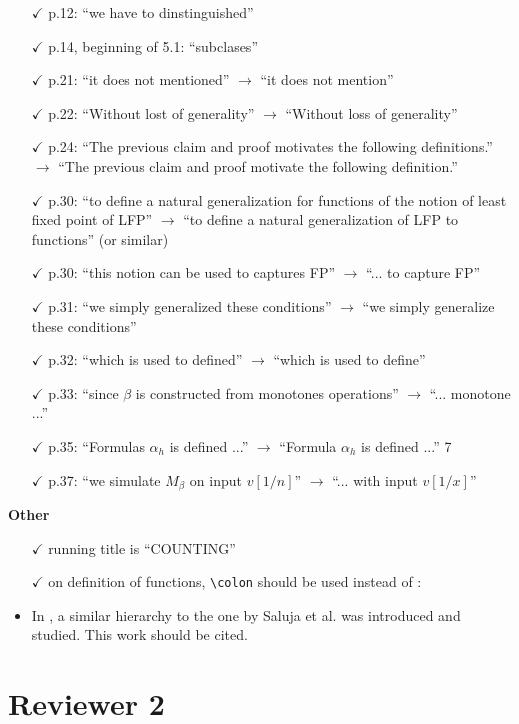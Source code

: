\documentclass[a4paper]{article}
\begin{document}
\begin{itemize}
	\item[$\checkmark$] p.12: ``we have to dinstinguished''
	\item[$\checkmark$] p.14, beginning of 5.1: ``subclases''
	\item[$\checkmark$] p.21: ``it does not mentioned'' $\to$ ``it does not mention''
	\item[$\checkmark$] p.22: ``Without lost of generality'' $\to$ ``Without loss of generality''
	\item[$\checkmark$] p.24: ``The previous claim and proof motivates the following definitions.'' $\to$ ``The previous
	claim and proof motivate the following definition.''
	\item[$\checkmark$] p.30: ``to define a natural generalization for functions of the notion of least fixed point of
	LFP'' $\to$ ``to define a natural generalization of LFP to functions'' (or similar)
	\item[$\checkmark$] p.30: ``this notion can be used to captures FP'' $\to$ ``... to capture FP''
	\item[$\checkmark$] p.31: ``we simply generalized these conditions'' $\to$ ``we simply generalize these conditions''
	\item[$\checkmark$] p.32: ``which is used to defined'' $\to$ ``which is used to define''
	\item[$\checkmark$] p.33: ``since $\beta$ is constructed from monotones operations'' $\to$ ``... monotone ...''
	\item[$\checkmark$] p.35: ``Formulas $\alpha_h$ is defined ...'' $\to$ ``Formula $\alpha_h$ is defined ...''
	7
	\item[$\checkmark$] p.37: ``we simulate $M_\beta$ on input $v[1/n]$'' $\to$ ``... with input $v[1/x]$''
\end{itemize}
\vspace{1em}
{\bf Other}
\begin{itemize}
	\setlength\itemsep{0.5em}
	\item[$\checkmark$] running title is ``COUNTING''
	\item[$\checkmark$] on definition of functions, \verb|\colon| should be used instead of :
	\item In \cite{DBLP:conf/csl/0001HKV16}, a similar hierarchy to the one by Saluja et al. was introduced and studied. This work should be cited.
\end{itemize}

\bigskip

\section*{Reviewer 2}
\end{document}
